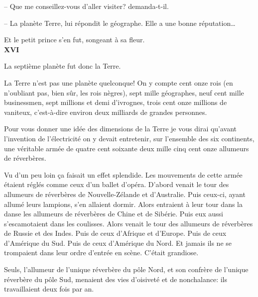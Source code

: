 \begin{Parallel}[p]{}{}
{-- Que me conseillez-vous d'aller visiter? demanda-t-il.

-- La planète Terre, lui répondit le géographe.
Elle a une bonne réputation\ldots{}

Et le petit prince s'en fut, songeant à sa fleur.\\

\textbf{XVI}

La septième planète fut donc la Terre.

La Terre n'est pas une planète quelconque! On y
compte cent onze rois (en n'oubliant pas, bien sûr,
les rois nègres), sept mille géographes, neuf cent
mille businessmen, sept millions et demi d'ivrognes,
trois cent onze millions de vaniteux, c'est-à-dire
environ deux milliards de grandes personnes.

Pour vous donner une idée des dimensions de la
Terre je vous dirai qu'avant l'invention de l'électricité
on y devait entretenir, sur l'ensemble des six continents, une véritable armée de quatre cent soixante
deux mille cinq cent onze allumeurs de réverbères.

Vu d'un peu loin ça faisait un effet splendide. Les
mouvements de cette armée étaient réglés comme
ceux d'un ballet d'opéra. D'abord venait le tour des
allumeurs de réverbères de Nouvelle-Zélande et
d'Australie. Puis ceux-ci, ayant allumé leurs lampions,
s'en allaient dormir. Alors entraient à leur tour dans la
danse les allumeurs de réverbères de Chine et de Sibérie.
Puis eux aussi s'escamotaient dans les coulisses.
Alors venait le tour des allumeurs de réverbères de
Russie et des Indes. Puis de ceux d'Afrique et d'Europe. Puis de ceux d'Amérique du Sud. Puis de ceux
d'Amérique du Nord. Et jamais ils ne se trompaient
dans leur ordre d'entrée en scène. C'était grandiose.

Seuls, l'allumeur de l'unique réverbère du pôle
Nord, et son confrère de l'unique réverbère du pôle
Sud, menaient des vies d'oisiveté et de nonchalance: ils travaillaient deux fois par an.
}


\end{Parallel}
